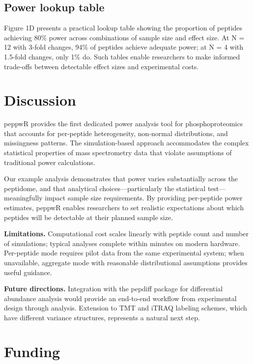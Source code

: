 \documentclass[
]{article}
\begin{document}
\subsection{Power lookup table}\label{power-lookup-table}

Figure 1D presents a practical lookup table showing the proportion of
peptides achieving 80\% power across combinations of sample size and
effect size. At N = 12 with 3-fold changes, 94\% of peptides achieve
adequate power; at N = 4 with 1.5-fold changes, only 1\% do. Such tables
enable researchers to make informed trade-offs between detectable effect
sizes and experimental costs.

\section{Discussion}\label{discussion}

peppwR provides the first dedicated power analysis tool for
phosphoproteomics that accounts for per-peptide heterogeneity,
non-normal distributions, and missingness patterns. The simulation-based
approach accommodates the complex statistical properties of mass
spectrometry data that violate assumptions of traditional power
calculations.

Our example analysis demonstrates that power varies substantially across
the peptidome, and that analytical choices---particularly the
statistical test---meaningfully impact sample size requirements. By
providing per-peptide power estimates, peppwR enables researchers to set
realistic expectations about which peptides will be detectable at their
planned sample size.

\textbf{Limitations.} Computational cost scales linearly with peptide
count and number of simulations; typical analyses complete within
minutes on modern hardware. Per-peptide mode requires pilot data from
the same experimental system; when unavailable, aggregate mode with
reasonable distributional assumptions provides useful guidance.

\textbf{Future directions.} Integration with the pepdiff package for
differential abundance analysis would provide an end-to-end workflow
from experimental design through analysis. Extension to TMT and iTRAQ
labeling schemes, which have different variance structures, represents a
natural next step.

\section{Funding}\label{funding}
\end{document}
